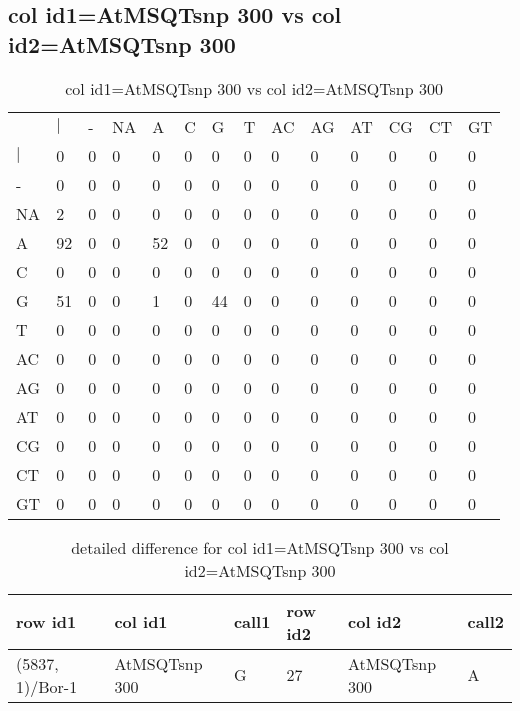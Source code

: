 \subsection{col id1=AtMSQTsnp 300 vs col id2=AtMSQTsnp 300}
\begin{center}
\begin{longtable}{|l|l|l|l|l|l|l|l|l|l|l|l|l|l|}
\caption{col id1=AtMSQTsnp 300 vs col id2=AtMSQTsnp 300} \label{table_dm638}\\
\hline
\\
\hline
&$|$&-&NA&A&C&G&T&AC&AG&AT&CG&CT&GT\\
$|$&0&0&0&0&0&0&0&0&0&0&0&0&0\\
-&0&0&0&0&0&0&0&0&0&0&0&0&0\\
NA&2&0&0&0&0&0&0&0&0&0&0&0&0\\
A&92&0&0&52&0&0&0&0&0&0&0&0&0\\
C&0&0&0&0&0&0&0&0&0&0&0&0&0\\
G&51&0&0&1&0&44&0&0&0&0&0&0&0\\
T&0&0&0&0&0&0&0&0&0&0&0&0&0\\
AC&0&0&0&0&0&0&0&0&0&0&0&0&0\\
AG&0&0&0&0&0&0&0&0&0&0&0&0&0\\
AT&0&0&0&0&0&0&0&0&0&0&0&0&0\\
CG&0&0&0&0&0&0&0&0&0&0&0&0&0\\
CT&0&0&0&0&0&0&0&0&0&0&0&0&0\\
GT&0&0&0&0&0&0&0&0&0&0&0&0&0\\
\hline
\end{longtable}
\end{center}

\begin{center}
\begin{longtable}{|l|l|l|l|l|l|}
\caption{detailed difference for col id1=AtMSQTsnp 300 vs col id2=AtMSQTsnp 300} \label{table_dm639}\\
\hline
row id1&col id1&call1&row id2&col id2&call2\\
\hline
(5837, 1)/Bor-1&AtMSQTsnp 300&G&27&AtMSQTsnp 300&A\\
\hline
\end{longtable}
\end{center}

